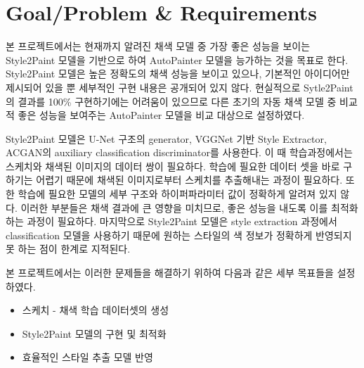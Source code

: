 \section{Goal/Problem \& Requirements}

본 프로젝트에서는 현재까지 알려진 채색 모델 중 가장 좋은 성능을 보이는 Style2Paint 모델을 기반으로 하여 AutoPainter 모델을 능가하는 것을 목표로 한다.
Style2Paint 모델은 높은 정확도의 채색 성능을 보이고 있으나, 기본적인 아이디어만 제시되어 있을 뿐 세부적인 구현 내용은 공개되어 있지 않다.
현실적으로 Sytle2Paint의 결과를 100\% 구현하기에는 어려움이 있으므로 다른 초기의 자동 채색 모델 중 비교적 좋은 성능을 보여주는 AutoPainter 모델을 비교 대상으로 설정하였다.

Style2Paint 모델은 U-Net 구조의 generator, VGGNet 기반 Style Extractor, ACGAN의 auxiliary classification discriminator를 사용한다.
이 때 학습과정에서는 스케치와 채색된 이미지의 데이터 쌍이 필요하다.
학습에 필요한 데이터 셋을 바로 구하기는 어렵기 때문에 채색된 이미지로부터 스케치를 추출해내는 과정이 필요하다.
또한 학습에 필요한 모델의 세부 구조와 하이퍼파라미터 값이 정확하게 알려져 있지 않다.
이러한 부분들은 채색 결과에 큰 영향을 미치므로, 좋은 성능을 내도록 이를 최적화하는 과정이 필요하다.
마지막으로 Style2Paint 모델은 style extraction 과정에서 classification 모델을 사용하기 때문에 원하는 스타일의 색 정보가 정확하게 반영되지 못 하는 점이 한계로 지적된다.

본 프로젝트에서는 이러한 문제들을 해결하기 위하여 다음과 같은 세부 목표들을 설정하였다.
\begin{itemize}[topsep=0pt,itemsep=-1ex,partopsep=1ex,parsep=1ex]
	\item 스케치 - 채색 학습 데이터셋의 생성
	\item Style2Paint 모델의 구현 및 최적화
	\item 효율적인 스타일 추출 모델 반영
\end{itemize}